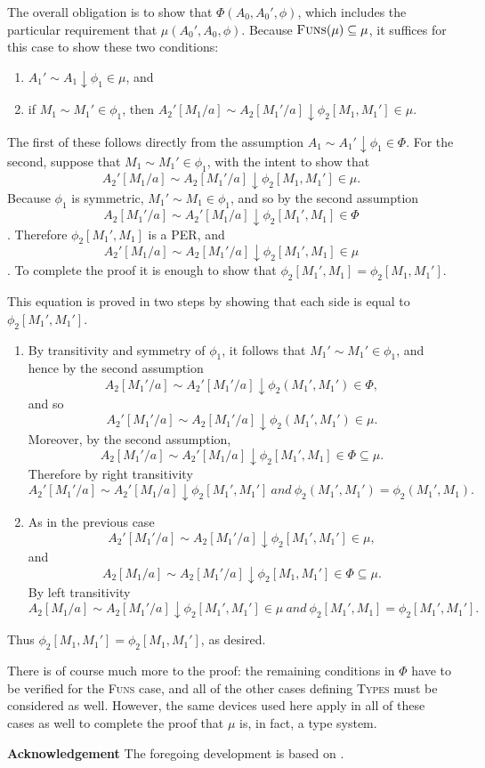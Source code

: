 \documentclass[11pt,twoside]{article}
\begin{document}
The overall obligation is to show that $\Phi(A_{0},A_{0}',\phi)$, which includes the particular
requirement that $\mu(A_{0}',A_{0},\phi)$.  Because $\textsc{Funs}(\mu)\subseteq\mu$, it suffices for this
case to show these two conditions:
\begin{enumerate}
\item $A_{1}'\sim A_{1}\downarrow\phi_{1}\in\mu$, and
\item if $M_1\sim M_1'\in\phi_{1}$, then $A_{2}'[M_1/a]\sim A_{2}[M_1'/a]\downarrow\phi_{2}[M_1,M_1']\in\mu$.
\end{enumerate}
The first of these follows directly from the assumption
$A_{1}\sim A_{1}'\downarrow\phi_{1}\in\Phi$.  For the second, suppose that
$M_1\sim M_1'\in\phi_{1}$, with the intent to show that
$$A_{2}'[M_1/a]\sim A_{2}[M_1'/a]\downarrow \phi_{2}[M_1,M_1']\in\mu.$$  Because $\phi_{1}$ is symmetric,
$M_1'\sim M_1\in\phi_{1}$, and so by the second assumption
$$A_{2}[M_1'/a] \sim A_{2}'[M_1/a]\downarrow\phi_{2}[M_1',M_1]\in\Phi$$.  Therefore $\phi_{2}[M_1',M_1]$ is a
PER, and
$$A_{2}'[M_1/a]\sim A_{2}[M_1'/a]\downarrow\phi_{2}[M_1',M_1]\in\mu$$.  To complete the proof it is
enough to show that $\phi_{2}[M_1',M_1]=\phi_{2}[M_1,M_1']$.

This equation is proved in two steps by showing that each side is equal to
$\phi_{2}[M_{1}',M_{1}']$.
\begin{enumerate}
\item By transitivity and symmetry of $\phi_{1}$, it follows that $M_{1}'\sim M_{1}'\in\phi_{1}$, and
  hence by the second assumption $$A_{2}[M_{1}'/a]\sim
  A_{2}'[M_{1}'/a]\downarrow\phi_{2}(M_{1}',M_{1}')\in\Phi,$$ and so
  $$A_{2}'[M_{1}'/a]\sim A_{2}[M_{1}'/a]\downarrow\phi_{2}(M_{1}',M_{1}')\in\mu.$$
  Moreover, by the second assumption, $$A_{2}[M_{1}'/a] \sim
  A_{2}'[M_{1}/a]\downarrow\phi_{2}[M_{1}',M_{1}]\in\Phi\subseteq\mu.$$
  Therefore by right transitivity
  $$A_{2}'[M_{1}'/a]\sim A_{2}'[M_{1}/a]\downarrow\phi_{2}[M_{1}',M_{1}']\ \textit{and}\ \phi_{2}(M_{1}',M_{1}')=\phi_{2}(M_{1}',M_{1}).$$
\item As in the previous case $$A_{2}'[M_{1}'/a] \sim A_{2}[M_{1}'/a] \downarrow \phi_{2}[M_{1}',M_{1}']\in\mu,$$
  and $$A_{2}[M_{1}/a]\sim A_{2}[M_{1}'/a]\downarrow\phi_{2}[M_{1},M_{1}']\in\Phi\subseteq\mu.$$
  By left transitivity
  $$A_{2}[M_{1}/a] \sim A_{2}[M_{1}'/a] \downarrow \phi_{2}[M_{1}',M_{1}']\in\mu\ \textit{and}\
  \phi_2[M_1',M_1]=\phi_2[M_1',M_1'].$$
\end{enumerate}
Thus $\phi_{2}[M_{1},M_{1}']=\phi_{2}[M_{1},M_{1}']$, as desired.

\bigskip

There is of course much more to the proof: the remaining conditions in $\Phi$ have to be
verified for the \textsc{Funs} case, and all of the other cases defining \textsc{Types}
must be considered as well.  However, the same devices used here apply in all of these
cases as well to complete the proof that $\mu$ is, in fact, a type system.

\bigskip

\noindent
\textbf{Acknowledgement}
The foregoing development is based on \citet{angiuli19}.

\nocite{angiuli19}



\end{document}
